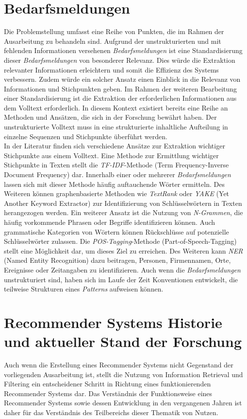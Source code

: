 \section{Bedarfsmeldungen}
Die Problemstellung umfasst eine Reihe von Punkten, die im Rahmen der Ausarbeitung zu behandeln sind. Aufgrund der unstrukturierten und mit fehlenden Informationen versehenen \emph{Bedarfsmeldungen} ist eine Standardisierung dieser \emph{Bedarfsmeldungen} von besonderer Relevanz. Dies würde die Extraktion relevanter Informationen erleichtern und somit die Effizienz des Systems verbessern. Zudem würde ein solcher Ansatz einen Einblick in die Relevanz von Informationen und Stichpunkten geben. Im Rahmen der weiteren Bearbeitung einer Standardisierung ist die Extraktion der erforderlichen Informationen aus dem Volltext erforderlich. In diesem Kontext existiert bereits eine Reihe an Methoden und Ansätzen, die sich in der Forschung bewährt haben. Der unstrukturierte Volltext muss in eine strukturierte inhaltliche Aufteilung in einzelne Sequenzen und Stichpunkte überführt werden.\\

In der Literatur finden sich verschiedene Ansätze zur Extraktion wichtiger Stichpunkte aus einem Volltext. Eine Methode zur Ermittlung wichtiger Stichpunkte in Texten stellt die \emph{TF-IDF}-Methode (Term Frequency-Inverse Document Frequency) dar. Innerhalb einer oder mehrerer \emph{Bedarfsmeldungen} lassen sich mit dieser Methode häufig auftauchende Wörter ermitteln. Des Weiteren können graphenbasierte Methoden wie \emph{TextRank} oder \emph{YAKE} (Yet Another Keyword Extractor) zur Identifizierung von Schlüsselwörtern in Texten herangezogen werden. Ein weiterer Ansatz ist die Nutzung von \emph{N-Grammen}, die häufig vorkommende Phrasen oder Begriffe identifizieren können. Auch grammatische Kategorien von Wörtern können Rückschlüsse auf potenzielle Schlüsselwörter zulassen. Die \emph{POS-Tagging}-Methode (Part-of-Speech-Tagging) stellt eine Möglichkeit dar, um dieses Ziel zu erreichen. Des Weiteren kann \emph{NER} (Named Entity Recognition) dazu beitragen, Personen, Firmennamen, Orte, Ereignisse oder Zeitangaben zu identifizieren. Auch wenn die \emph{Bedarfsmeldungen} unstrukturiert sind, haben sich im Laufe der Zeit Konventionen entwickelt, die teilweise Strukturen eines \emph{Patterns} aufweisen können.

\section{Recommender Systems Historie und aktueller Stand der Forschung}
Auch wenn die Erstellung eines Recommender Systems nicht Gegenstand der vorliegenden Ausarbeitung ist, stellt die Nutzung von Information Retrieval und Filtering ein entscheidener Schritt in Richtung eines funktionierenden Recommender Systems dar. Das Verständnis der Funktionsweise eines Recommender Systems sowie dessen Entwicklung in den vergangenen Jahren ist daher für das Verständnis des Teilbereichs dieser Thematik von Nutzen.\\

